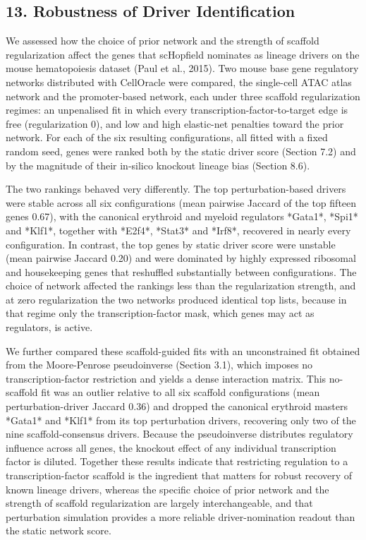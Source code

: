 \documentclass[11pt]{article}
\begin{document}
\subsection*{13. Robustness of Driver Identification}

We assessed how the choice of prior network and the strength of scaffold regularization affect the genes that scHopfield nominates as lineage drivers on the mouse hematopoiesis dataset (Paul et al., 2015). Two mouse base gene regulatory networks distributed with CellOracle were compared, the single-cell ATAC atlas network and the promoter-based network, each under three scaffold regularization regimes: an unpenalised fit in which every transcription-factor-to-target edge is free (regularization 0), and low and high elastic-net penalties toward the prior network. For each of the six resulting configurations, all fitted with a fixed random seed, genes were ranked both by the static driver score (Section 7.2) and by the magnitude of their in-silico knockout lineage bias (Section 8.6).

The two rankings behaved very differently. The top perturbation-based drivers were stable across all six configurations (mean pairwise Jaccard of the top fifteen genes 0.67), with the canonical erythroid and myeloid regulators *Gata1*, *Spi1* and *Klf1*, together with *E2f4*, *Stat3* and *Irf8*, recovered in nearly every configuration. In contrast, the top genes by static driver score were unstable (mean pairwise Jaccard 0.20) and were dominated by highly expressed ribosomal and housekeeping genes that reshuffled substantially between configurations. The choice of network affected the rankings less than the regularization strength, and at zero regularization the two networks produced identical top lists, because in that regime only the transcription-factor mask, which genes may act as regulators, is active.

We further compared these scaffold-guided fits with an unconstrained fit obtained from the Moore-Penrose pseudoinverse (Section 3.1), which imposes no transcription-factor restriction and yields a dense interaction matrix. This no-scaffold fit was an outlier relative to all six scaffold configurations (mean perturbation-driver Jaccard 0.36) and dropped the canonical erythroid masters *Gata1* and *Klf1* from its top perturbation drivers, recovering only two of the nine scaffold-consensus drivers. Because the pseudoinverse distributes regulatory influence across all genes, the knockout effect of any individual transcription factor is diluted. Together these results indicate that restricting regulation to a transcription-factor scaffold is the ingredient that matters for robust recovery of known lineage drivers, whereas the specific choice of prior network and the strength of scaffold regularization are largely interchangeable, and that perturbation simulation provides a more reliable driver-nomination readout than the static network score.
\end{document}
